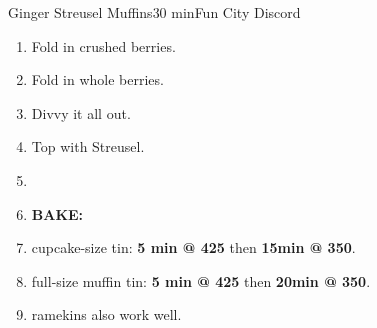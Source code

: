 \documentclass[]{mikescards}
\begin{document}
\begin{recipe}{Ginger Streusel Muffins}{30 min}{Fun City Discord}
\begin{parcolumns}[colwidths={1=120pt}, rulebetween]{2}
{\begin{enumerate}
      \item Fold in crushed berries.
      \item Fold in whole berries.
      \item Divvy it all out.
      \item Top with Streusel.
      \item 
      \item \textbf{BAKE:}
      \item \hspace{5pt} \textbullet \hspace{2pt} cupcake-size tin:     \textbf{5 min @ 425\textdegree} then \textbf{15min @ 350\textdegree}.
      \item \hspace{5pt} \textbullet \hspace{2pt} full-size muffin tin: \textbf{5 min @ 425\textdegree} then \textbf{20min @ 350\textdegree}.
      \item \hspace{5pt} \textbullet \hspace{2pt} ramekins also work well.
    \end{enumerate}
  }
\end{parcolumns}

\end{recipe}
\end{document}
